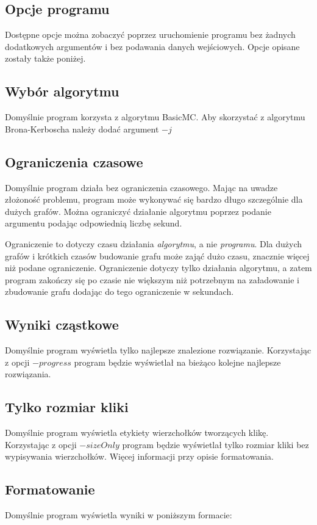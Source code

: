 \documentclass[12pt, a4paper]{article}
\begin{document}
\subsection{Opcje programu}
Dostępne opcje można zobaczyć poprzez uruchomienie programu bez żadnych dodatkowych argumentów i bez podawania danych wejściowych. Opcje opisane zostały także poniżej.

\subsection{Wybór algorytmu}
Domyślnie program korzysta z algorytmu BasicMC. Aby skorzystać z algorytmu Brona-Kerboscha należy dodać argument $-j$

\subsection{Ograniczenia czasowe}
Domyślnie program działa bez ograniczenia czasowego. Mając na uwadze złożoność problemu, program może wykonywać się bardzo długo szczególnie dla dużych grafów. Można ograniczyć działanie algorytmu poprzez podanie argumentu \emph{} podając odpowiednią liczbę sekund.

Ograniczenie to dotyczy czasu działania \emph{algorytmu}, a nie \emph{programu}. Dla dużych grafów i krótkich czasów budowanie grafu może zająć dużo czasu, znacznie więcej niż podane ograniczenie. Ograniczenie dotyczy tylko działania algorytmu, a zatem program zakończy się po czasie nie większym niż potrzebnym na załadowanie i zbudowanie grafu dodając do tego ograniczenie w sekundach.

\subsection{Wyniki cząstkowe}
Domyślnie program wyświetla tylko najlepsze znalezione rozwiązanie. Korzystając z opcji $-progress$ program będzie wyświetlał na bieżąco kolejne najlepsze rozwiązania.

\subsection{Tylko rozmiar kliki}
Domyślnie program wyświetla etykiety wierzchołków tworzących klikę. Korzystając z opcji $-sizeOnly$ program będzie wyświetlał tylko rozmiar kliki bez wypisywania wierzchołków. Więcej informacji przy opisie formatowania.

\subsection{Formatowanie}
Domyślnie program wyświetla wyniki w poniższym formacie:
\end{document}
